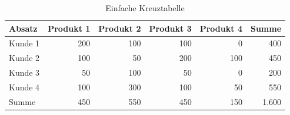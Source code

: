 \begin{table}[htbp]
  \centering
  \caption{Einfache Kreuztabelle}
  \label{tab:Einfache_Kreuztabelle}
  \small
  \begin{tabular}{lrrrrr}
    \toprule
    Absatz & Produkt 1 & Produkt 2 & Produkt 3 & Produkt 4 & Summe \\
    \midrule
    Kunde 1 & 200 & 100 & 100 & 0 & 400 \\
    Kunde 2 & 100 & 50 & 200 & 100 & 450 \\
    Kunde 3 & 50 & 100 & 50 & 0 & 200 \\
    Kunde 4 & 100 & 300 & 100 & 50 & 550 \\
    \midrule
    Summe & 450 & 550 & 450 & 150 & 1.600 \\
    \bottomrule
  \end{tabular}
\end{table}
